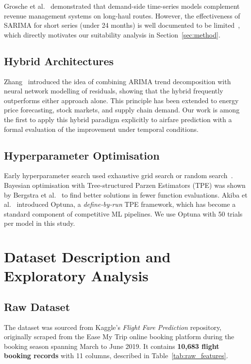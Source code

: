 \documentclass[12pt, a4paper]{article}
\begin{document}
Grosche et al.~\cite{grosche2007} demonstrated that demand-side time-series
models complement revenue management systems on long-haul routes.  However,
the effectiveness of SARIMA for short series (under 24 months) is well
documented to be limited~\cite{shumway2017}, which directly motivates our
suitability analysis in Section~\ref{sec:method}.

\subsection{Hybrid Architectures}

Zhang~\cite{zhang2003} introduced the idea of combining ARIMA trend
decomposition with neural network modelling of residuals, showing that the
hybrid frequently outperforms either approach alone.  This principle has been
extended to energy price forecasting, stock markets, and supply chain demand.
Our work is among the first to apply this hybrid paradigm explicitly to airfare
prediction with a formal evaluation of the improvement under temporal conditions.

\subsection{Hyperparameter Optimisation}

Early hyperparameter search used exhaustive grid search or random
search~\cite{bergstra2012}.  Bayesian optimisation with Tree-structured Parzen
Estimators (TPE) was shown by Bergstra et al.~\cite{bergstra2011} to find
better solutions in fewer function evaluations.  Akiba et al.~\cite{akiba2019}
introduced Optuna, a \textit{define-by-run} TPE framework, which has become a
standard component of competitive ML pipelines.  We use Optuna with 50 trials
per model in this study.

\section{Dataset Description and Exploratory Analysis}
\label{sec:data}

\subsection{Raw Dataset}

The dataset was sourced from Kaggle's \textit{Flight Fare Prediction}
repository, originally scraped from the Ease My Trip online booking platform
during the booking season spanning March to June 2019.  It contains
\textbf{10{,}683 flight booking records} with 11 columns, described in
Table~\ref{tab:raw_features}.
\end{document}
